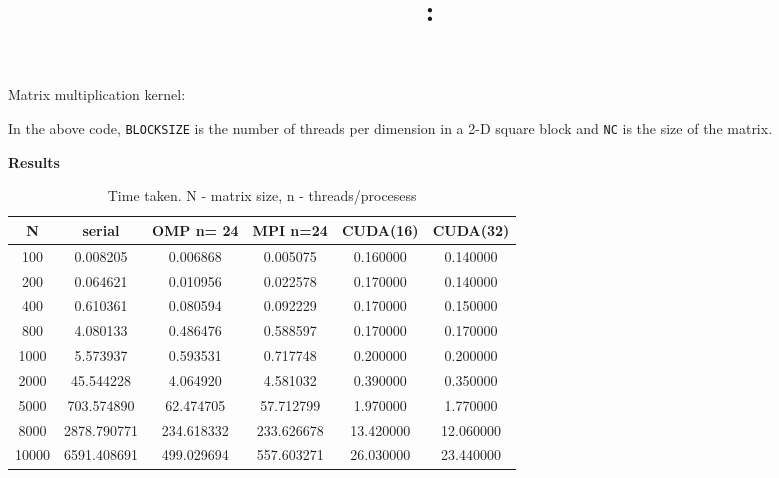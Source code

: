 \documentclass{article}
\title{
	\vspace{2in}
	\textmd{\textbf{\hmwkClass:\ \hmwkTitle}}\\
	\vspace{3in}
}
\author{\textbf{\hmwkAuthorName}}
\date{} %
\begin{document}

Matrix multiplication kernel:


In the above code, \verb|BLOCKSIZE| is the number of threads per dimension in
a 2-D square block and \verb|NC| is the size of the matrix.

\textbf{Results}
\begin{table}[h]
	\caption{Time taken. N - matrix size, n - threads/procesess}
	\centering
	\begin{tabular}{| S[round-precision=3] | S[round-precision=3] | S[round-precision=3] | S[round-precision=3] | S[round-precision=3] | S[round-precision=3] |}
			\hline
			{N}&{serial} & {OMP n= 24} & {MPI n=24} & {CUDA(16)} & {CUDA(32)}\\ \hline
			{100}&0.008205
			&0.006868 &0.005075 &0.160000 &0.140000 \\ \hline

			{200}&0.064621&0.010956
			&0.022578&0.170000 &0.140000\\ \hline

			{400} &0.610361&0.080594 
			&0.092229&0.170000 &0.150000\\ \hline

			{800}&4.080133&0.486476
			&0.588597&0.170000 &0.170000\\ \hline

			{1000}&5.573937&0.593531
			&0.717748 &0.200000 &0.200000\\ \hline

			{2000}&45.544228&4.064920
			&4.581032 &0.390000 &0.350000\\ \hline

			{5000}&703.574890&62.474705
			&57.712799 &1.970000 &1.770000\\ \hline

			{8000}&2878.790771 
			&234.618332
			&233.626678 &13.420000 &12.060000 \\ \hline

			{10000}&6591.408691 
			&499.029694&557.603271 &26.030000 &23.440000\\ 
			\hline
		\end{tabular}


\end{table}
\end{document}
